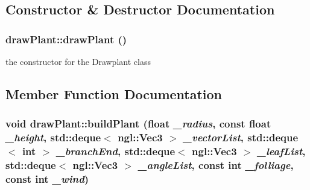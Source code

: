 \subsection{Constructor \& Destructor Documentation}
\hypertarget{classdrawPlant_a463d6595d05cfbf83f0f0f4550cde659}{
\subsubsection[{drawPlant}]{\setlength{\rightskip}{0pt plus 5cm}drawPlant::drawPlant ()}}
\label{classdrawPlant_a463d6595d05cfbf83f0f0f4550cde659}


the constructor for the Drawplant class 

\subsection{Member Function Documentation}
\hypertarget{classdrawPlant_a037a68037dc91313242a1a9a33622d76}{
\subsubsection[{buildPlant}]{\setlength{\rightskip}{0pt plus 5cm}void drawPlant::buildPlant (float {\em \_\-radius}, \/  const float {\em \_\-height}, \/  std::deque$<$ ngl::Vec3 $>$ {\em \_\-vectorList}, \/  std::deque$<$ int $>$ {\em \_\-branchEnd}, \/  std::deque$<$ ngl::Vec3 $>$ {\em \_\-leafList}, \/  std::deque$<$ ngl::Vec3 $>$ {\em \_\-angleList}, \/  const int {\em \_\-folliage}, \/  const int {\em \_\-wind})}}
\label{classdrawPlant_a037a68037dc91313242a1a9a33622d76}


